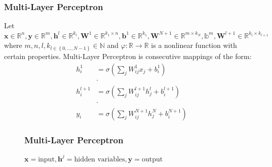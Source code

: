 \begin{frame}
\frametitle{Multi-Layer Perceptron}
\begin{Def}
Let $\boldsymbol{x} \in \mathbb{R}^n,\boldsymbol{y} \in \mathbb{R}^m, \boldsymbol{h}^l \in \mathbb{R}^{k_l}, \boldsymbol{W}^1 \in \mathbb{R}^{k_1 \times n}
, \boldsymbol{b}^1 \in \mathbb{R}^{k_1}, \boldsymbol{W}^{N+1} \in \mathbb{R}^{m \times k_N}, \mathbb{b}^m,\boldsymbol{W}^{l+1} \in \mathbb{R}^{k_l \times k_{l+1}}$ 
where $m,n,l,k_{l\in \left\{0,\ldots,N-1\right\}} \in \mathbb{N}$ and $\varphi \colon \mathbb{R} \to \mathbb{R}$ is a 
nonlinear function with certain properties. Multi-Layer Perceptron is consecutive mappings of the form:
\begin{equation}
\begin{split}
    h_i^{1}   &= \sigma \left( \sum_{j}^{} W_{ij}^{1}x_j + b_i^{1} \right)\\ 
            & \cdot\\
    h_i^{l+1} &= \sigma \left( \sum_{j}^{} W_{ij}^{l+1}h_j^l + b_i^{l+1} \right)\\
            & \cdot\\
    y_i^{}    &= \sigma \left( \sum_{j}^{} W_{ij}^{N+1}h_j^N + b_i^{N+1} \right)
\end{split}
\end{equation}
\end{Def}
\end{frame} 


\begin{frame}
\begin{figure}
    \frametitle{Multi-Layer Perceptron}
    \centering
    \resizebox{1.0\textwidth}{!}{}
    \caption{$\boldsymbol{x} =\text{input},\boldsymbol{h}^j=\text{hidden variables},\boldsymbol{y}=\text{output}$}
    \label{fig:multi_layer_perceptron}
\end{figure}
\end{frame} 

